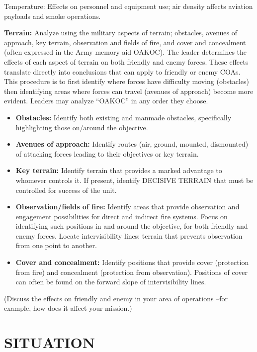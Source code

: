 \documentclass[letterpaper,tgtermes,9pt,microtype,colorlinks=true,urlcolor=blue,DIV=calc,pagesize]{scrartcl}
\begin{document}
Temperature: Effects on personnel and equipment use; air density affects
aviation payloads and smoke operations.

\textbf{Terrain:} Analyze using the military aspects of terrain; obstacles, avenues of
approach, key terrain, observation and fields of fire, and cover and
concealment (often expressed in the Army memory aid OAKOC). The leader
determines the effects of each aspect of terrain on both friendly and enemy
forces. These effects translate directly into conclusions that can apply to
friendly or enemy COAs. This procedure is to first identify where forces have
difficulty moving (obstacles) then identifying areas where forces can travel
(avenues of approach) become more evident. Leaders may analyze “OAKOC” in any
order they choose.

\begin{itemize}
\item \textbf{Obstacles:} Identify both existing and manmade obstacles, specifically
highlighting those on/around the objective.
\item \textbf{Avenues of approach:} Identify routes (air, ground, mounted, dismounted) of
attacking forces leading to their objectives or key terrain.
\item \textbf{Key terrain:} Identify terrain that provides a marked advantage to whomever
controls it. If present, identify DECISIVE TERRAIN that must be controlled
for success of the unit.
\item \textbf{Observation/fields of fire:} Identify areas that provide observation and
engagement possibilities for direct and indirect fire systems. Focus on
identifying such positions in and around the objective, for both friendly
and enemy forces. Locate intervisibility lines: terrain that prevents
observation from one point to another.
\item \textbf{Cover and concealment:} Identify positions that provide cover (protection
from fire) and concealment (protection from observation). Positions of cover
can often be found on the forward slope of intervisibility lines.
\end{itemize}

(Discuss the effects on friendly and enemy in your area of operations –for
example, how does it affect your mission.)
\section{\textbf{SITUATION}}
\label{sec:org1de75d2}
\end{document}
